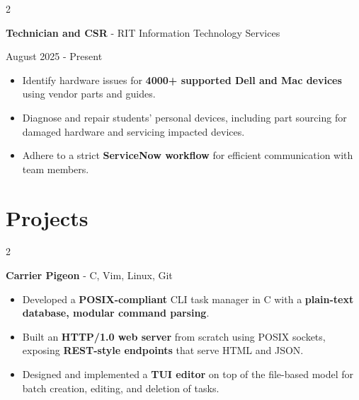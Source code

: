 \documentclass[10pt, letterpaper]{article}
\newenvironment{highlights}{
    \begin{itemize}[
        topsep=0.10 cm,
        parsep=0.10 cm,
        partopsep=0pt,
        itemsep=0pt,
        leftmargin=0.4 cm + 10pt
    ]
}{
    \end{itemize}
} %
\newenvironment{twocolentry}[2][]{
    \onecolentry
    \def\secondColumn{#2}
    \setcolumnwidth{\fill, 4.5 cm}
    \begin{paracol}{2}
}{
    \switchcolumn \raggedleft \secondColumn
    \end{paracol}
    \endonecolentry
} %
\let\hrefWithoutArrow\href
\renewcommand{\href}[2]{\hrefWithoutArrow{#1}{\ifthenelse{\equal{#2}{}}{ }{#2 }\raisebox{.15ex}{\footnotesize \faExternalLink*}}}
\begin{document}
        \vspace{0.05 cm}
        
\begin{twocolentry}
    {August 2025 - Present}
    {\textbf{Technician and CSR} - RIT Information Technology Services}
\end{twocolentry}
            \begin{highlights}
                \item Identify hardware issues for {\color{purple}\textbf{4000+ supported Dell and Mac devices}} using vendor parts and guides.
                \item Diagnose and repair students' personal devices, including part sourcing for damaged hardware and servicing impacted devices.
                \item Adhere to a strict {\color{purple}\textbf{ServiceNow workflow}} for efficient communication with team members.
            \end{highlights}

    \vspace{-0.2cm}

   \section{\large\bfseries Projects} 

\begingroup

\begin{twocolentry}{
    \hrefWithoutArrow{https://github.com/shaeespring/CarrierPigeon}{{\footnotesize\faGithub}\hspace*{0.13cm}{shaeespring/CarrierPigeon}}
}
    \textbf{Carrier Pigeon} - C, Vim, Linux, Git 
\end{twocolentry}
    \begin{highlights}
    \item Developed a {\color{purple}\textbf{POSIX-compliant}} CLI task manager in C with a {\color{purple}\textbf{plain-text database, modular command parsing}}.
    \item Built an {\color{purple}\textbf{HTTP/1.0 web server}} from scratch using POSIX sockets, exposing {\color{purple}\textbf{REST-style endpoints}} that serve HTML and JSON.
    \item Designed and implemented a {\color{purple}\textbf{TUI editor}} on top of the file-based model for batch creation, editing, and deletion of tasks.
    \end{highlights}

\vspace{0.05 cm}
\end{document}

